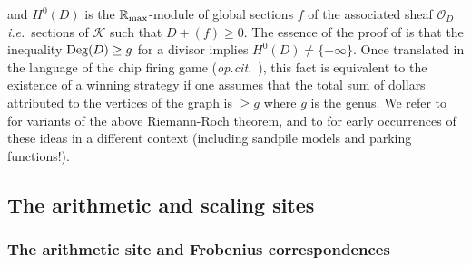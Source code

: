 \documentclass[12pt]{article}
\def\R{{\mathbb R}}
\def\cK{{\mathcal K}}
\def\cO{{\mathcal O}}
\newcommand{\ie}{{\it i.e.\/}\ }
\newcommand{\opcit}{{\it op.cit.\/}\ }
\def\rma{\R_{\rm max}}
\begin{document}
and $H^0(D)$ is the $\rma$-module of global sections $f$ of the associated sheaf $\cO_D$ \ie sections of $\cK$ such that $D+(f)\geq 0$. 
The essence of the proof of \cite{BN} is that  the inequality ${\rm Deg}(D)\geq g$ for a divisor  implies $H^0(D)\neq \{-\infty\}$. Once translated in the language of the chip firing game (\opcit\!\!),  this fact is equivalent  to the existence of a winning strategy if one assumes that the total sum of dollars attributed to the vertices of the graph is $\geq g$ where $g$ is the genus. We refer to \cite{GK,MZ} for variants of the above Riemann-Roch  theorem, and to \cite{Dhar, Shor, PostS} for early occurrences of these ideas in a different context (including sandpile models and parking functions!).



\subsection{The arithmetic and scaling sites}




\subsubsection{The arithmetic site and Frobenius correspondences}
\end{document}

